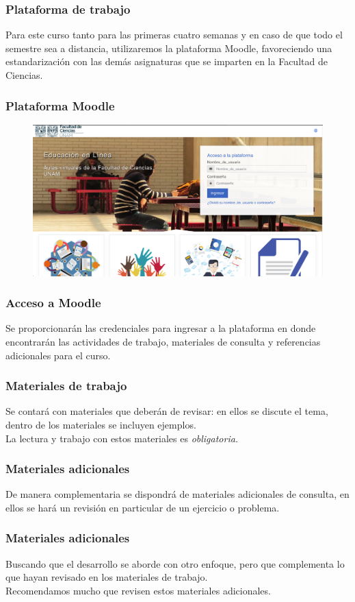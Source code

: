 \documentclass[12pt]{beamer}
\begin{document}
\begin{frame}
\frametitle{Plataforma de trabajo}
Para este curso tanto para las primeras cuatro semanas y en caso de que todo el semestre sea a distancia,  utilizaremos la plataforma Moodle, favoreciendo una estandarización con las demás asignaturas que se imparten en la Facultad de Ciencias.
\end{frame}
\begin{frame}
\frametitle{Plataforma Moodle}
\begin{figure}
\centering
\includegraphics[scale=0.2]{Imagenes/Moodle_Ciencias.png}
\end{figure}
\end{frame}
\begin{frame}
\frametitle{Acceso a Moodle}
Se proporcionarán las credenciales para ingresar a la plataforma en donde encontrarán las actividades de trabajo, materiales de consulta y referencias adicionales para el curso.
\end{frame}
\begin{frame}
\frametitle{Materiales de trabajo}
Se contará con materiales que deberán de revisar: en ellos se discute el tema, dentro de los materiales se incluyen ejemplos.
\\
\bigskip
La lectura y trabajo con estos materiales es \emph{obligatoria.}
\end{frame}
\begin{frame}
\frametitle{Materiales adicionales}
De manera complementaria se dispondrá de materiales adicionales de consulta, en ellos se hará un revisión en particular de un ejercicio o problema.
\end{frame}
\begin{frame}
\frametitle{Materiales adicionales}
Buscando que el desarrollo se aborde con otro enfoque, pero que complementa lo que hayan revisado en los materiales de trabajo.
\\
\bigskip
Recomendamos mucho que revisen estos materiales adicionales.
\end{frame}
\end{document}
